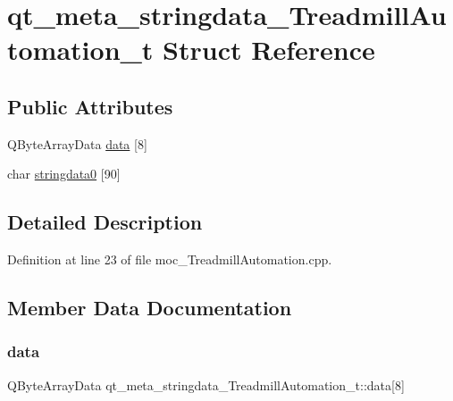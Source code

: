 \hypertarget{structqt__meta__stringdata___treadmill_automation__t}{}\section{qt\+\_\+meta\+\_\+stringdata\+\_\+\+Treadmill\+Automation\+\_\+t Struct Reference}
\label{structqt__meta__stringdata___treadmill_automation__t}
\subsection*{Public Attributes}
\begin{DoxyCompactItemize}
\item 
Q\+Byte\+Array\+Data \hyperlink{structqt__meta__stringdata___treadmill_automation__t_adc7b766e60e3c9765803a09ac0fa5362}{data} \mbox{[}8\mbox{]}
\item 
char \hyperlink{structqt__meta__stringdata___treadmill_automation__t_a976913c0cbfb9ef3d5616762b0123605}{stringdata0} \mbox{[}90\mbox{]}
\end{DoxyCompactItemize}


\subsection{Detailed Description}


Definition at line 23 of file moc\+\_\+\+Treadmill\+Automation.\+cpp.



\subsection{Member Data Documentation}
\mbox{\label{structqt__meta__stringdata___treadmill_automation__t_adc7b766e60e3c9765803a09ac0fa5362}} 
\subsubsection{\texorpdfstring{data}{data}}
{\footnotesize\ttfamily Q\+Byte\+Array\+Data qt\+\_\+meta\+\_\+stringdata\+\_\+\+Treadmill\+Automation\+\_\+t\+::data\mbox{[}8\mbox{]}}



